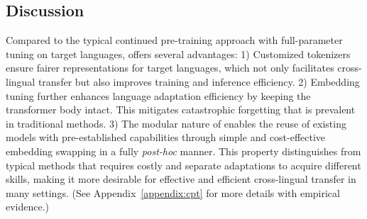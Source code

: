 \subsection{Discussion}
Compared to the typical continued pre-training approach with full-parameter tuning on target languages, \ouradapter offers several advantages: 1) Customized tokenizers ensure fairer representations for target languages, which not only facilitates cross-lingual transfer but also improves training and inference efficiency. 2) Embedding tuning further enhances language adaptation efficiency by keeping the transformer body intact. This mitigates catastrophic forgetting that is prevalent in traditional methods. 3) The modular nature of \ouradapter enables the reuse of existing models with pre-established capabilities through simple and cost-effective embedding swapping in a fully \emph{post-hoc} manner. This property distinguishes \ouradapter from typical methods that requires costly and separate adaptations to acquire different skills, making it more desirable for effective and efficient cross-lingual transfer in many settings. (See Appendix~\ref{appendix:cpt} for more details with empirical evidence.)

